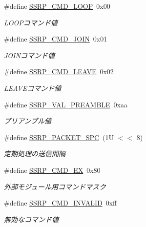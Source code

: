 \begin{DoxyCompactItemize}
\#define \hyperlink{ssrp_8h_aa1031b596776a63602e2df610c63a148_aa1031b596776a63602e2df610c63a148}{S\+S\+R\+P\+\_\+\+C\+M\+D\+\_\+\+L\+O\+O\+P}~0x00
\begin{DoxyCompactList}\small\item\em L\+O\+O\+Pコマンド値 \end{DoxyCompactList}\item 
\#define \hyperlink{ssrp_8h_ababd7808112858fa10ac7143a748ea51_ababd7808112858fa10ac7143a748ea51}{S\+S\+R\+P\+\_\+\+C\+M\+D\+\_\+\+J\+O\+I\+N}~0x01
\begin{DoxyCompactList}\small\item\em J\+O\+I\+Nコマンド値 \end{DoxyCompactList}\item 
\#define \hyperlink{ssrp_8h_a5a91c530f07fd0d850782c090238634e_a5a91c530f07fd0d850782c090238634e}{S\+S\+R\+P\+\_\+\+C\+M\+D\+\_\+\+L\+E\+A\+V\+E}~0x02
\begin{DoxyCompactList}\small\item\em L\+E\+A\+V\+Eコマンド値 \end{DoxyCompactList}\item 
\#define \hyperlink{ssrp_8h_a8effb0515a3a94dc375d8d2f06daf627_a8effb0515a3a94dc375d8d2f06daf627}{S\+S\+R\+P\+\_\+\+V\+A\+L\+\_\+\+P\+R\+E\+A\+M\+B\+L\+E}~0xaa
\begin{DoxyCompactList}\small\item\em プリアンブル値 \end{DoxyCompactList}\item 
\#define \hyperlink{ssrp_8h_acb6a8cfed76fc5f18e699e7f476491ea_acb6a8cfed76fc5f18e699e7f476491ea}{S\+S\+R\+P\+\_\+\+P\+A\+C\+K\+E\+T\+\_\+\+S\+P\+C}~(1\+U $<$$<$ 8)
\begin{DoxyCompactList}\small\item\em 定期処理の送信間隔 \end{DoxyCompactList}\item 
\#define \hyperlink{ssrp_8h_a76d2edb3e4836c0d2444a1627ea57f1b_a76d2edb3e4836c0d2444a1627ea57f1b}{S\+S\+R\+P\+\_\+\+C\+M\+D\+\_\+\+E\+X}~0x80
\begin{DoxyCompactList}\small\item\em 外部モジュール用コマンドマスク \end{DoxyCompactList}\item 
\#define \hyperlink{ssrp_8h_ae0034a89b11e015781cdddd1c8ac788e_ae0034a89b11e015781cdddd1c8ac788e}{S\+S\+R\+P\+\_\+\+C\+M\+D\+\_\+\+I\+N\+V\+A\+L\+I\+D}~0xff
\begin{DoxyCompactList}\small\item\em 無効なコマンド値 \end{DoxyCompactList}\item 
$$
\end{DoxyCompactItemize}
